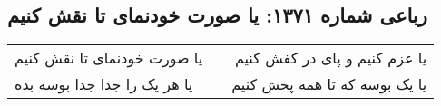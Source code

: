 \begin{center}
\section*{رباعی شماره ۱۳۷۱: یا صورت خودنمای تا نقش کنیم}
\label{sec:1371}
\begin{longtable}{l p{0.5cm} r}
یا صورت خودنمای تا نقش کنیم
&&
یا عزم کنیم و پای در کفش کنیم
\\
یا هر یک را جدا جدا بوسه بده
&&
یا یک بوسه که تا همه پخش کنیم
\\
\end{longtable}
\end{center}
